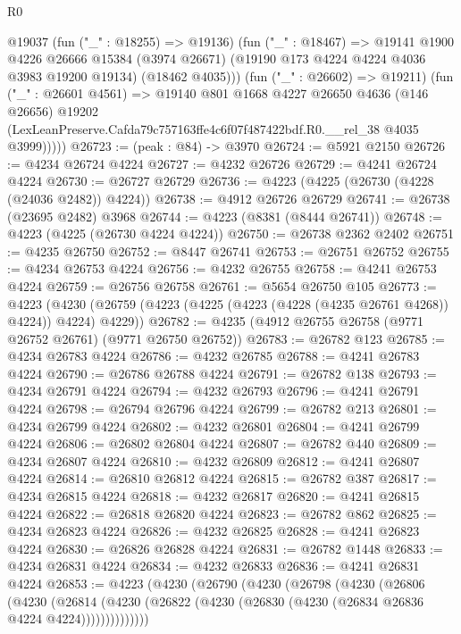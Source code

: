 \begin{lexlean}{R0}
\begin{coremodule}
            @19037
            (fun ("_" : @18255) => @19136)
            (fun ("_" : @18467) =>
            @19141
              @1900
              @4226
              @26666
              @15384
              (@3974 @26671)
              (@19190 @173 @4224 @4224 @4036 @3983 @19200 @19134)
              (@18462 @4035)))
          (fun ("_" : @26602) => @19211)
          (fun ("_" : @26601 @4561) =>
          @19140
            @801
            @1668
            @4227
            @26650
            @4636
            (@146 @26656)
            @19202
            (LexLeanPreserve.Cafda79c757163ffe4c6f07f487422bdf.R0.__rel_38 @4035 @3999)))))
@26723 := (peak : @84) -> @3970
@26724 := @5921 @2150
@26726 := @4234 @26724 @4224
@26727 := @4232 @26726
@26729 := @4241 @26724 @4224
@26730 := @26727 @26729
@26736 := @4223 (@4225 (@26730 (@4228 (@24036 @2482)) @4224))
@26738 := @4912 @26726 @26729
@26741 := @26738 (@23695 @2482) @3968
@26744 := @4223 (@8381 (@8444 @26741))
@26748 := @4223 (@4225 (@26730 @4224 @4224))
@26750 := @26738 @2362 @2402
@26751 := @4235 @26750
@26752 := @8447 @26741
@26753 := @26751 @26752
@26755 := @4234 @26753 @4224
@26756 := @4232 @26755
@26758 := @4241 @26753 @4224
@26759 := @26756 @26758
@26761 := @5654 @26750 @105
@26773 := @4223
    (@4230 (@26759 (@4223 (@4225 (@4223 (@4228 (@4235 @26761 @4268)) @4224)) @4224) @4229))
@26782 := @4235 (@4912 @26755 @26758 (@9771 @26752 @26761) (@9771 @26750 @26752))
@26783 := @26782 @123
@26785 := @4234 @26783 @4224
@26786 := @4232 @26785
@26788 := @4241 @26783 @4224
@26790 := @26786 @26788 @4224
@26791 := @26782 @138
@26793 := @4234 @26791 @4224
@26794 := @4232 @26793
@26796 := @4241 @26791 @4224
@26798 := @26794 @26796 @4224
@26799 := @26782 @213
@26801 := @4234 @26799 @4224
@26802 := @4232 @26801
@26804 := @4241 @26799 @4224
@26806 := @26802 @26804 @4224
@26807 := @26782 @440
@26809 := @4234 @26807 @4224
@26810 := @4232 @26809
@26812 := @4241 @26807 @4224
@26814 := @26810 @26812 @4224
@26815 := @26782 @387
@26817 := @4234 @26815 @4224
@26818 := @4232 @26817
@26820 := @4241 @26815 @4224
@26822 := @26818 @26820 @4224
@26823 := @26782 @862
@26825 := @4234 @26823 @4224
@26826 := @4232 @26825
@26828 := @4241 @26823 @4224
@26830 := @26826 @26828 @4224
@26831 := @26782 @1448
@26833 := @4234 @26831 @4224
@26834 := @4232 @26833
@26836 := @4241 @26831 @4224
@26853 := @4223
    (@4230
      (@26790
        (@4230
          (@26798
            (@4230
              (@26806
                (@4230
                  (@26814
                    (@4230 (@26822 (@4230 (@26830 (@4230 (@26834 @26836 @4224 @4224))))))))))))))

\end{coremodule}
\end{lexlean}
